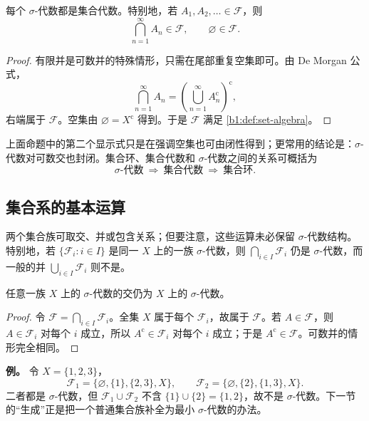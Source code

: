 \begin{proposition}
\label{b1:prop:sigma-closure}
每个 \(\sigma\)-代数都是集合代数。特别地，若 \(A_1,A_2,\ldots\in\mathcal F\)，则
\[
\bigcap_{n=1}^{\infty}A_n\in\mathcal F,
\qquad
\varnothing\in\mathcal F.
\]
\end{proposition}
\begin{proof}
有限并是可数并的特殊情形，只需在尾部重复空集即可。由 De Morgan 公式，
\[
\bigcap_{n=1}^{\infty}A_n
=\left(\bigcup_{n=1}^{\infty}A_n^{\mathrm c}\right)^{\mathrm c},
\]
右端属于 \(\mathcal F\)。空集由 \(\varnothing=X^{\mathrm c}\) 得到。于是 \(\mathcal F\) 满足 \cref{b1:def:set-algebra}。
\end{proof}

上面命题中的第二个显示式只是在强调空集也可由闭性得到；更常用的结论是：\(\sigma\)-代数对可数交也封闭。集合环、集合代数和 \(\sigma\)-代数之间的关系可概括为
\[
\sigma\text{-代数}\ \Longrightarrow\ \text{集合代数}\ \Longrightarrow\ \text{集合环}.
\]

\subsection{集合系的基本运算}
\label{b1:subsec:010104}

两个集合族可取交、并或包含关系；但要注意，这些运算未必保留 \(\sigma\)-代数结构。特别地，若 \(\{\mathcal F_i:i\in I\}\) 是同一 \(X\) 上的一族 \(\sigma\)-代数，则 \(\bigcap_{i\in I}\mathcal F_i\) 仍是 \(\sigma\)-代数，而一般的并 \(\bigcup_{i\in I}\mathcal F_i\) 则不是。

\begin{proposition}
\label{b1:prop:intersection-sigma}
任意一族 \(X\) 上的 \(\sigma\)-代数的交仍为 \(X\) 上的 \(\sigma\)-代数。
\end{proposition}
\begin{proof}
令 \(\mathcal F=\bigcap_{i\in I}\mathcal F_i\)。全集 \(X\) 属于每个 \(\mathcal F_i\)，故属于 \(\mathcal F\)。若 \(A\in\mathcal F\)，则 \(A\in\mathcal F_i\) 对每个 \(i\) 成立，所以 \(A^{\mathrm c}\in\mathcal F_i\) 对每个 \(i\) 成立；于是 \(A^{\mathrm c}\in\mathcal F\)。可数并的情形完全相同。
\end{proof}

\begin{remark}
\label{b1:rem:union-not-sigma}
\textbf{例。}
令 \(X=\{1,2,3\}\)，
\[
\mathcal F_1=\{\varnothing,\{1\},\{2,3\},X\},
\qquad
\mathcal F_2=\{\varnothing,\{2\},\{1,3\},X\}.
\]
二者都是 \(\sigma\)-代数，但 \(\mathcal F_1\cup\mathcal F_2\) 不含 \(\{1\}\cup\{2\}=\{1,2\}\)，故不是 \(\sigma\)-代数。下一节的“生成”正是把一个普通集合族补全为最小 \(\sigma\)-代数的办法。
\end{remark}
